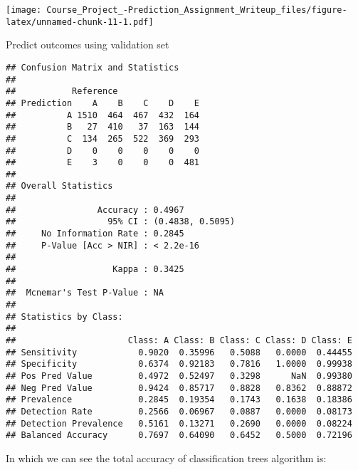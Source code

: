 \documentclass[
]{article}
\newenvironment{Shaded}{\begin{snugshade}}{\end{snugshade}}
\newcommand{\DecValTok}[1]{\textcolor[rgb]{0.00,0.00,0.81}{#1}}
\newcommand{\KeywordTok}[1]{\textcolor[rgb]{0.13,0.29,0.53}{\textbf{#1}}}
\newcommand{\NormalTok}[1]{#1}
\newcommand{\OperatorTok}[1]{\textcolor[rgb]{0.81,0.36,0.00}{\textbf{#1}}}
\newcommand{\StringTok}[1]{\textcolor[rgb]{0.31,0.60,0.02}{#1}}
\begin{document}
\texttt{[image: Course\_Project\_-Prediction\_Assignment\_Writeup\_files/figure-latex/unnamed-chunk-11-1.pdf]}

Predict outcomes using validation set

\begin{Shaded}
\end{Shaded}

\begin{verbatim}
## Confusion Matrix and Statistics
## 
##           Reference
## Prediction    A    B    C    D    E
##          A 1510  464  467  432  164
##          B   27  410   37  163  144
##          C  134  265  522  369  293
##          D    0    0    0    0    0
##          E    3    0    0    0  481
## 
## Overall Statistics
##                                           
##                Accuracy : 0.4967          
##                  95% CI : (0.4838, 0.5095)
##     No Information Rate : 0.2845          
##     P-Value [Acc > NIR] : < 2.2e-16       
##                                           
##                   Kappa : 0.3425          
##                                           
##  Mcnemar's Test P-Value : NA              
## 
## Statistics by Class:
## 
##                      Class: A Class: B Class: C Class: D Class: E
## Sensitivity            0.9020  0.35996   0.5088   0.0000  0.44455
## Specificity            0.6374  0.92183   0.7816   1.0000  0.99938
## Pos Pred Value         0.4972  0.52497   0.3298      NaN  0.99380
## Neg Pred Value         0.9424  0.85717   0.8828   0.8362  0.88872
## Prevalence             0.2845  0.19354   0.1743   0.1638  0.18386
## Detection Rate         0.2566  0.06967   0.0887   0.0000  0.08173
## Detection Prevalence   0.5161  0.13271   0.2690   0.0000  0.08224
## Balanced Accuracy      0.7697  0.64090   0.6452   0.5000  0.72196
\end{verbatim}

In which we can see the total accuracy of classification trees algorithm
is:

\begin{Shaded}
\end{Shaded}
\end{document}
